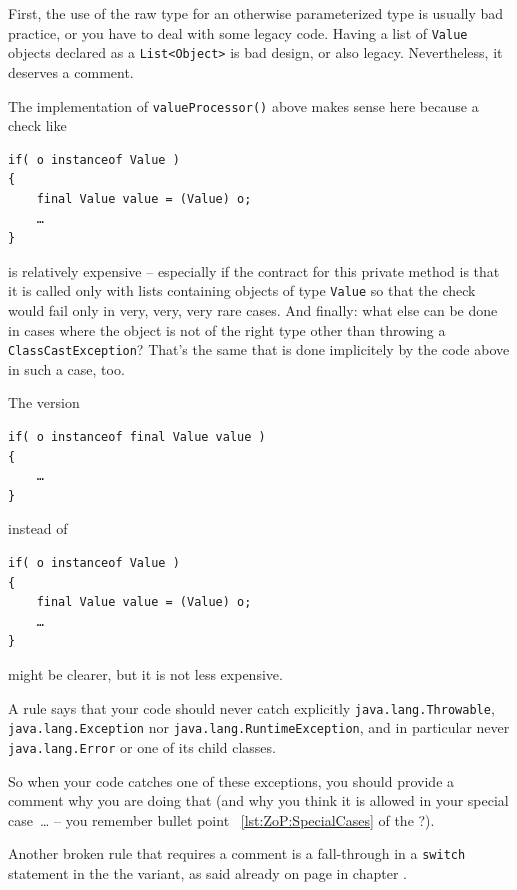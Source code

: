 First, the use of the raw type for an otherwise parameterized type is usually bad practice, or you have to deal with some legacy code. Having a list of \lstinline|Value| objects declared as a \lstinline|List<Object>| is bad design, or also legacy. Nevertheless, it deserves a comment.

The implementation of \lstinline|valueProcessor()| above makes sense here because a check like
\begin{lstlisting}
if( o instanceof Value )
{ 
    final Value value = (Value) o;
    …
}
\end{lstlisting}
is relatively expensive – especially if the contract for this private method is that it is called only with lists containing objects of type \lstinline|Value| so that the check would fail only in very, very, very rare cases. And finally: what else can be done in cases where the object is not of the right type other than throwing a \lstinline|ClassCastException|? That's the same that is done implicitely by the code above in such a case, too.

The version
\begin{lstlisting}
if( o instanceof final Value value )
{
    …
}
\end{lstlisting}
instead of
\begin{lstlisting}
if( o instanceof Value )
{ 
    final Value value = (Value) o;
    …
}
\end{lstlisting}
might be clearer, but it is not less expensive.

A rule says that your code should never catch explicitly \lstinline|java.lang.Throwable|, \lstinline|java.lang.Exception| nor \lstinline|java.lang.RuntimeException|, and in particular never \lstinline|java.lang.Error| or one of its child classes.

So when your code catches one of these exceptions, you should provide a comment why you are doing that (and why you think it is allowed in your special case~… – you remember bullet point ~\ref{lst:ZoP:SpecialCases} of the \ngref?).

Another broken rule that requires a comment is a fall-through in a \lstinline|switch| statement in the the  variant, as said already on page \pageref{sec:TraditionalSwitch} in chapter .

